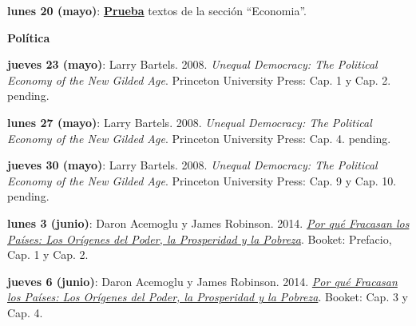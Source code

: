 \documentclass[letterpaper]{article}
\renewenvironment{itemize}{
  \begin{list}{}{
    \setlength{\leftmargin}{1.5em}
  }
}{
  \end{list}
}
\begin{document}
\begin{enumerate}
\begin{itemize}
    \vspace{0.4cm}

     \item[\Pointinghand] {\bf lunes 20 (mayo)}: {\bf \underline{Prueba}} textos de la secci\'on ``Economia''.
	\end{itemize}

\item {\bf Pol\'itica}

	\begin{itemize}

		\item {\bf jueves 23 (mayo)}: Larry Bartels. 2008. \emph{Unequal Democracy: The Political Economy of the New Gilded Age}. Princeton University Press: Cap. 1 y Cap. 2. {\color{red}pending.}

		\vspace{0.2cm}

		\item {\bf lunes 27 (mayo)}: Larry Bartels. 2008. \emph{Unequal Democracy: The Political Economy of the New Gilded Age}. Princeton University Press: Cap. 4. {\color{red}pending.}

		\vspace{0.2cm}

		\item {\bf jueves 30 (mayo)}: Larry Bartels. 2008. \emph{Unequal Democracy: The Political Economy of the New Gilded Age}. Princeton University Press: Cap. 9 y Cap. 10. {\color{red}pending.}

		\vspace{0.2cm}

		\item {\bf lunes 3 (junio)}: Daron Acemoglu y James Robinson. 2014. \href{https://github.com/hbahamonde/Intro_Ciencias_Sociales/raw/master/Readings/Why_Nations_Fail.pdf}{\emph{Por qu\'e Fracasan los Pa\'ises: Los Or\'igenes del Poder, la Prosperidad y la Pobreza}}. Booket: Prefacio, Cap. 1 y Cap. 2.

    \vspace{0.2cm}

		\item {\bf jueves 6 (junio)}: Daron Acemoglu y James Robinson. 2014. \href{https://github.com/hbahamonde/Intro_Ciencias_Sociales/raw/master/Readings/Why_Nations_Fail.pdf}{\emph{Por qu\'e Fracasan los Pa\'ises: Los Or\'igenes del Poder, la Prosperidad y la Pobreza}}. Booket: Cap. 3 y Cap. 4.


\end{itemize}
\end{enumerate}
\end{document}
